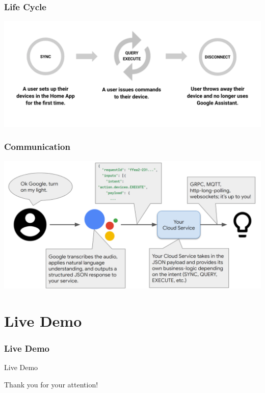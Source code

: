\documentclass{beamer}
\begin{document}
\begin{frame}
\frametitle{Life Cycle}
\begin{center}
\includegraphics[scale=0.22]{pictures/cycle.png}
\end{center}
\end{frame}

\begin{frame}
\frametitle{Communication}
\begin{center}
\includegraphics[scale=0.22]{pictures/communication_btw.png}
\end{center}
\end{frame}


\section{Live Demo}

\begin{frame}
\frametitle{Live Demo}
\begin{center}
{\fontsize{30}{40}\selectfont Live Demo}
\end{center}
\end{frame}


\begin{frame}
\begin{center}
{\fontsize{30}{40}\selectfont Thank you for your attention!}
\end{center}
\end{frame}

\end{document}
